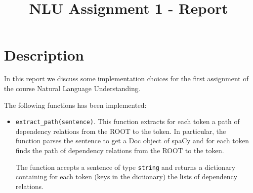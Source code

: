 \documentclass[conference]{IEEEtran}
\begin{document}
\title{NLU Assignment 1 - Report\\
}

\author{
}

\maketitle


\section{Description}
In this report we discuss some implementation choices for the first assignment of the course Natural Language Understanding.

The following functions has been implemented:
\begin{itemize}
    \item \texttt{extract\_path(sentence)}. This function extracts for each token a path of dependency relations from the 
    ROOT to the token. In particular, the function parses the sentence to get a Doc object of spaCy and for each token 
    finds the path of dependency relations from the ROOT to the token.

    The function accepts a sentence of type \texttt{string} and returns a dictionary containing for each token (keys in the dictionary)
    the lists of dependency relations.
\end{itemize}

\end{document}
